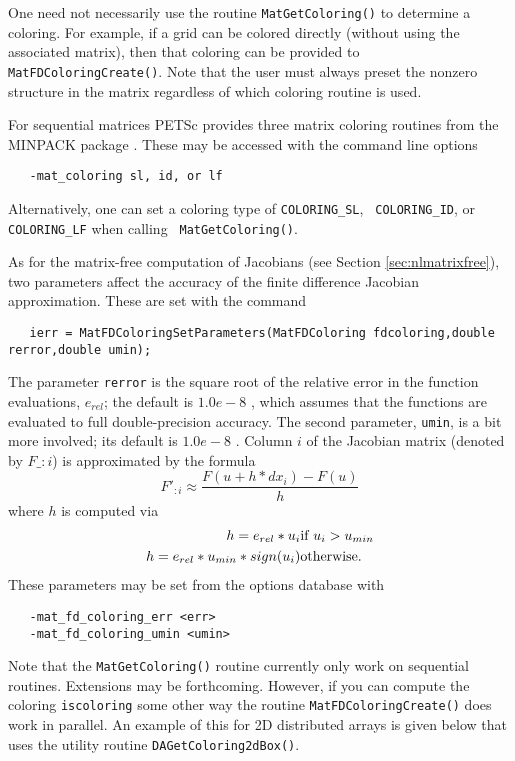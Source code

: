 One need not necessarily use the routine {\tt MatGetColoring()} to
determine a coloring.  For example, if a grid can be colored directly
(without using the associated matrix), then that coloring can be provided
to {\tt MatFDColoringCreate()}.  Note that the user must always
preset the nonzero structure in the matrix regardless of which
coloring routine is used.

For sequential matrices PETSc provides three matrix coloring routines from the 
MINPACK package \cite{more84}. These may be accessed with the command line options
\begin{verbatim}
   -mat_coloring sl, id, or lf
\end{verbatim}
Alternatively, one can set a coloring type of {\tt COLORING\_SL}, {\tt
COLORING\_ID}, or {\tt COLORING\_LF} when calling {\tt
MatGetColoring()}.   

As for the matrix-free computation of Jacobians (see Section
\ref{sec:nlmatrixfree}), two parameters affect the accuracy of the
finite difference Jacobian approximation.  These are set with the command
\begin{verbatim}
   ierr = MatFDColoringSetParameters(MatFDColoring fdcoloring,double rerror,double umin);
\end{verbatim}
The parameter {\tt rerror} is the square root of 
the relative error in the function evaluations, $e_{rel}$; the default is $ 1.0e-8 $ , which assumes
that the functions are evaluated to full double-precision accuracy. The 
second parameter, {\tt umin}, is a bit more involved; its default is 
$ 1.0e-8 $ .  Column $i$ of the Jacobian matrix (denoted by $F\_{:i}$) is 
approximated by the formula
\[
    F'_{:i} \approx \frac{F(u + h*dx_{i}) - F(u)}{h}
\]
where $ h $ is computed via 
\begin{eqnarray*}
        h = e_{rel}*u_{i}             &    \hbox{if }  u_{i} > u_{min} \\
        h = e_{rel}*u_{min}*sign(u_{i})  &    \hbox{otherwise}.
\end{eqnarray*}
These parameters may be set from the options database with 
\begin{verbatim}
   -mat_fd_coloring_err <err>
   -mat_fd_coloring_umin <umin>
\end{verbatim}
 

Note that the {\tt MatGetColoring()} routine currently 
only work on sequential routines.  Extensions may be forthcoming. However,
if you can compute the coloring {\tt iscoloring} some other way the routine
{\tt MatFDColoringCreate()} does work in parallel. An example of this for 
2D distributed arrays is given below that uses the utility routine
{\tt DAGetColoring2dBox()}. 


